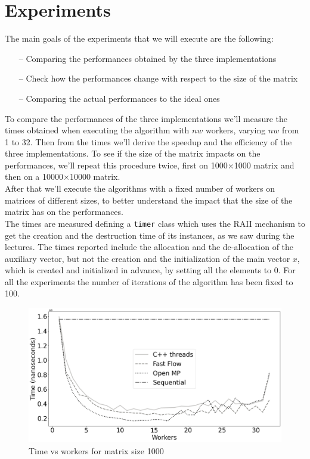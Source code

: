 \documentclass[12pt]{article}
\begin{document}
	\section{Experiments}
	The main goals of the experiments that we will execute are the following: 
	\begin{itemize}
		\item[--] Comparing the performances obtained by the three implementations 
		\item[--] Check how the performances change with respect to the size of the matrix
		\item[--] Comparing the actual performances to the ideal ones
	\end{itemize}
	To compare the performances of the three implementations we'll measure the times obtained when executing the algorithm with $nw$ workers, varying $nw$ from 1 to 32. Then from the times we'll derive the speedup and the efficiency of the three implementations. To see if the size of the matrix impacts on the performances, we'll repeat this procedure twice, first on 1000$\times$1000 matrix and then on a 10000$\times$10000 matrix.\\
	After that we'll execute the algorithms with a fixed number of workers on matrices of different sizes, to better understand the impact that the size of the matrix has on the performances.\\
	The times are measured defining a \verb*|timer| class which uses the RAII mechanism to get the creation and the destruction time of its instances, as we saw during the lectures. The times reported include the allocation and the de-allocation of the auxiliary vector, but not the creation and the initialization of the main vector $x$, which is created and initialized in advance, by setting all the elements to 0. For all the experiments the number of iterations of the algorithm has been fixed to 100.
		
	\begin{figure}[H]
		\centering
		\includegraphics[width=13cm]{./images/time_vs_cores_1000}
		\caption{Time vs workers for matrix size 1000}
	\end{figure}
	
\end{document}
